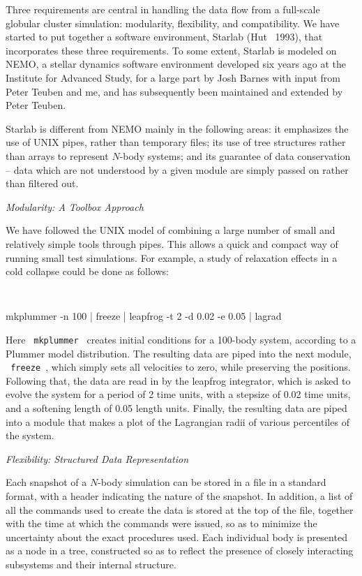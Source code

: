 Three requirements are central in handling the data flow from a
full-scale globular cluster simulation: modularity, flexibility, and
compatibility.  We have started to put together a software
environment, Starlab (Hut \etal\ 1993), that incorporates these three
requirements.  To some extent, Starlab is modeled on NEMO, a stellar
dynamics software environment developed six years ago at the Institute
for Advanced Study, for a large part by Josh Barnes with input from
Peter Teuben and me, and has subsequently been maintained and extended
by Peter Teuben.

Starlab is different from NEMO mainly in the following areas: it
emphasizes the use of UNIX pipes, rather than temporary files; its use
of tree structures rather than arrays to represent $N$-body systems; and
its guarantee of data conservation -- data which are not understood by
a given module are simply passed on rather than filtered out.

\bigskip
\noindent
{\it Modularity: A Toolbox Approach}
\medskip

We have followed the UNIX model of combining a large number of small and
relatively simple tools through pipes.  This allows a quick and
compact way of running small test simulations.  For example, a study
of relaxation effects in a cold collapse could be done as follows:

\def\codes{
\parindent=0pt
\obeylines
\tt
\medskip
}

{\codes
mkplummer -n 100 | freeze | leapfrog -t 2 -d 0.02 -e 0.05 | lagrad
}
\medskip

Here {\tt \ mkplummer\ } creates initial conditions for a 100-body system,
according to a Plummer model distribution.  The resulting data are
piped into the next module, {\tt \ freeze\ }, which simply sets all
velocities to zero, while preserving the positions.  Following that,
the data are read in by the leapfrog integrator, which is asked to
evolve the system for a period of 2 time units, with a stepsize of
0.02 time units, and a softening length of 0.05 length units.  Finally,
the resulting data are piped into a module that makes a plot of the
Lagrangian radii of various percentiles of the system.

\bigskip
\noindent
{\it Flexibility: Structured Data Representation}
\medskip

Each snapshot of a $N$-body simulation can be stored in a file in a
standard format, with a header indicating the nature of the snapshot.
In addition, a list of all the commands used to create the data is
stored at the top of the file, together with the time at which the
commands were issued, so as to minimize the uncertainty about the
exact procedures used.  Each individual body is presented as a node in
a tree, constructed so as to reflect the presence of closely
interacting subsystems and their internal structure.

